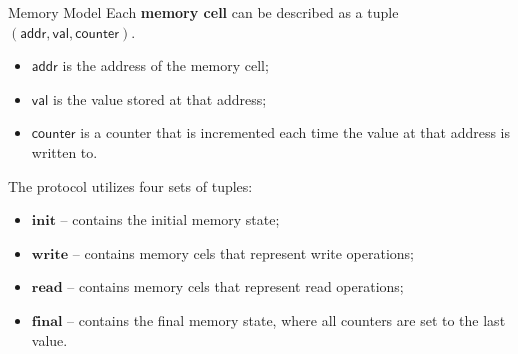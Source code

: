 \documentclass{zkdl-presentation-template}
\begin{document}
    \begin{frame}{Memory Model}
        Each \textbf{memory cell} can be described as a tuple $\mathsf{(addr, val, counter)}$.
        \begin{itemize}
            \item $\mathsf{addr}$ is the address of the memory cell;
            \vspace{-5px}
            \item $\mathsf{val}$ is the value stored at that address;
            \vspace{-5px}
            \item $\mathsf{counter}$ is a counter that is incremented each time the value at that address is written to.
        \end{itemize}

        \pause

        \vspace{5px}
        The protocol utilizes four sets of tuples:
        \begin{itemize}
            \item $\mathbf{init}$ -- contains the initial memory state;
            \vspace{-5px}
            \item $\mathbf{write}$ -- contains memory cels that represent write operations;
            \vspace{-5px}
            \item $\mathbf{read}$ -- contains memory cels that represent read operations;
            \vspace{-5px}
            \item $\mathbf{final}$ -- contains the final memory state, where all counters are set to the last value.
        \end{itemize}
    \end{frame}
\end{document}
